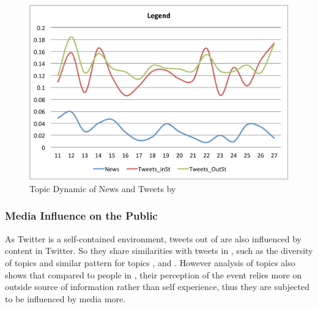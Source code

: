 \begin{figure}[htpb]
\centering
{}
\includegraphics[width=0.5\linewidth]{figures/4_Legend_cut.pdf}
\caption{Topic Dynamic of News and Tweets by \stlda}\label{fig:topics_news_tweets}
\end{figure}

\subsubsection{Media Influence on the Public}
As Twitter is a self-contained environment, tweets out of \stlouis are also influenced by content in Twitter. So they share similarities with tweets in \stlouis, such as the diversity of topics and similar pattern for topics \pray, \emotion and \newsreport. However analysis of topics also shows that compared to people in \stlouis, their perception of the event relies more on outside source of information rather than self experience, thus they are subjected to be influenced by media more.


